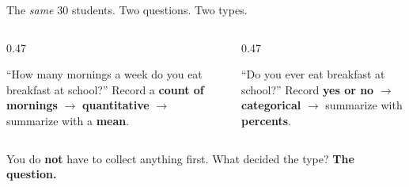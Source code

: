 \documentclass[aspectratio=169, 11pt]{beamer}
\newcommand{\redink}[1]{{\color{redacc}\bfseries #1}}
\begin{document}
\begin{frame}[t, plain]
  \vspace{4pt}
  \begin{center}
    {\large The \emph{same} 30 students. Two questions. Two types.}
  \end{center}
  \vspace{6pt}
  \begin{columns}[t]
    \begin{column}{0.47\textwidth}
      \begin{block}{``How many mornings a week do you eat breakfast at school?''}
        Record a \textbf{count of mornings} $\to$ \textbf{\color{cerulean}quantitative}
        $\to$ summarize with a \textbf{mean}.
      \end{block}
    \end{column}
    \begin{column}{0.47\textwidth}
      \begin{block}{``Do you ever eat breakfast at school?''}
        Record \textbf{yes or no} $\to$ \textbf{\color{cerulean}categorical}
        $\to$ summarize with \textbf{percents}.
      \end{block}
    \end{column}
  \end{columns}
  \vspace{10pt}
  \begin{center}
    {\large You do \redink{not} have to collect anything first. What decided the type?
    \redink{The question.}}
  \end{center}
\end{frame}
\end{document}
